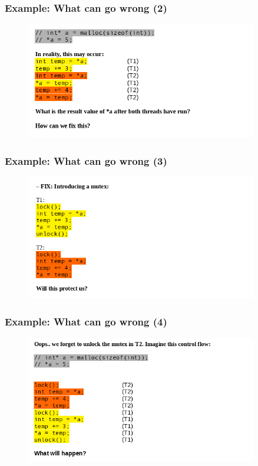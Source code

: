\documentclass[xcolor={usenames,dvipsnames}]{beamer}
\begin{document}
\begin{frame}
\frametitle{Example: What can go wrong (2)}
\begin{figure}
\includegraphics[width=0.9\textwidth]{images/what-can-go-wrong-2.png}
\end{figure}
\end{frame}

\begin{frame}
\frametitle{Example: What can go wrong (3)}
\begin{figure}
\includegraphics[width=0.9\textwidth]{images/what-can-go-wrong-3.png}
\end{figure}
\end{frame}

\begin{frame}
\frametitle{Example: What can go wrong (4)}
\begin{figure}
\includegraphics[width=0.9\textwidth]{images/what-can-go-wrong-4.png}
\end{figure}
\end{frame}
\end{document}

